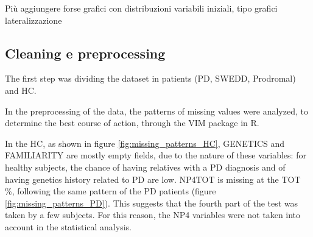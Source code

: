 \documentclass[]{article}
\begin{document}
\begin{multicols}{2}
Più aggiungere forse grafici con distribuzioni variabili iniziali, tipo grafici lateralizzazione

\subsection{Cleaning e preprocessing}

The first step was dividing the dataset in patients (PD, SWEDD, Prodromal) and HC.

In the preprocessing of the data, the patterns of missing values were analyzed, to determine the best course of action, through the VIM package in R.

In the HC, as shown in figure \ref{fig:missing_patterns_HC}, GENETICS and FAMILIARITY are mostly empty fields, due to the nature of these variables: for healthy subjects, the chance of having relatives with a PD diagnosis and of having genetics history related to PD are low. NP4TOT is missing at the TOT \%, following the same pattern of the PD patients (figure \ref{fig:missing_patterns_PD}). This suggests that the fourth part of the test was taken by a few subjects. For this reason, the NP4 variables were not taken into account in the statistical analysis.

\end{multicols}
\end{document}
